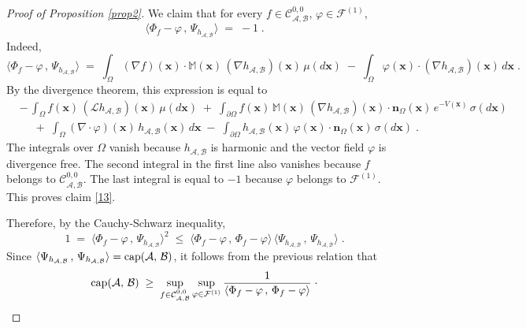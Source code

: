 \documentclass[reqno]{amsart}
\newcounter{as}[section]
\newcommand{\mc}[1]{{\mathcal #1}}
\newcommand{\bb}[1]{{\mathbb #1}}
\newcommand{\bs}[1]{{\boldsymbol #1}}
\newcommand{\<}{\langle}
\renewcommand{\>}{\rangle}
\renewcommand{\Cap}{{\rm cap}}
\begin{document}
\begin{proof}[Proof of Proposition \ref{prop2}]
We claim that for every $f\in \mathcal C^{0,0}_{\mc A,\mc B}$, $\varphi \in \mathcal
F^{(1)}$,
\begin{equation}
\label{13}
\< \Phi_f - \varphi \,,\, \Psi_{h_{\mc A,\mc B}} \> \; =\; -1\;.
\end{equation}
Indeed,
\begin{equation*}
\< \Phi_f - \varphi \,,\, \Psi_{h_{\mc A,\mc B}} \> \; =\;
\int_{\Omega} (\nabla f)(\bs{x}) \cdot \bb M(\bs{x}) \, (\nabla h_{\mc A,\mc B}) (\bs{x})
\, \mu(d\bs{x}) \;-\; \int_{\Omega} \varphi (\bs{x}) \cdot (\nabla h_{\mc A,\mc B}) (\bs{x})
\, d\bs{x} \;.
\end{equation*}
By the divergence theorem, this expression is equal to
\begin{align*}
& -\, \int_{\Omega} f(\bs{x}) \, (\mathcal L h_{\mc A,\mc B}) (\bs{x}) \, \mu(d\bs{x})
\;+\; \int_{\partial \Omega} f(\bs{x}) \, \bb M(\bs{x}) \, (\nabla h_{\mc A,\mc B}) (\bs{x})
\cdot \bs n_{\Omega}(\bs{x}) \, e^{-V(\bs{x})} \, \sigma(d\bs{x})\\
& \quad \;+\; \int_{\Omega} (\nabla \cdot \varphi) (\bs{x}) \, h_{\mc A,\mc B} (\bs{x}) \, d\bs{x}
\;-\; \int_{\partial \Omega} h_{\mc A,\mc B} (\bs{x}) \, \varphi (\bs{x})
\cdot \bs n_{\Omega}(\bs{x}) \, \sigma(d\bs{x}) \;.
\end{align*}
The integrals over $\Omega$ vanish because $h_{\mc A,\mc B}$ is harmonic and
the vector field $\varphi$ is divergence free. The second integral in
the first line also vanishes because $f$ belongs to $\mathcal
C^{0,0}_{\mc A,\mc B}$. The last integral is equal to $-1$ because $\varphi$
belongs to $\mathcal F^{(1)}$. This proves claim \eqref{13}.

Therefore, by the Cauchy-Schwarz inequality,
\begin{equation*}
1\;=\; \< \Phi_f - \varphi \,,\, \Psi_{h_{\mc A,\mc B}} \>^2 \;\le\;
\< \Phi_f - \varphi \,,\, \Phi_f - \varphi \>\,
\< \Psi_{h_{\mc A,\mc B}} \,,\, \Psi_{h_{\mc A,\mc B}} \> \;.
\end{equation*}
Since $\< \Psi_{h_{\mc A,\mc B}} \,,\, \Psi_{h_{\mc A,\mc B}} \> = \Cap(\mc A,\,\mc B)$, it
follows from the previous relation that
\begin{equation*}
\Cap(\mc A,\,\mc B) \;\ge\; \sup_{f\in \mathcal C^{0,0}_{\mc A,\mc B}} \sup_{\varphi \in \mathcal
  F^{(1)}} \frac 1{\< \Phi_f - \varphi \,,\, \Phi_f - \varphi
  \>}\;\cdot
\end{equation*}


\end{proof}
\end{document}
